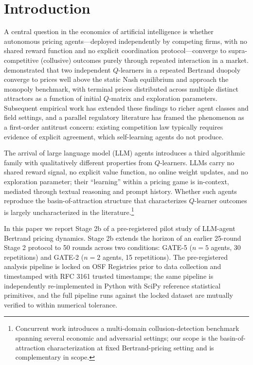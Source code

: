 \section{Introduction}
\label{sec:intro}

A central question in the economics of artificial intelligence is whether autonomous pricing
agents---deployed independently by competing firms, with no shared reward function and no
explicit coordination protocol---converge to supra-competitive (collusive) outcomes purely
through repeated interaction in a market. \citet{calvano_etal_2020_ai_algorithmic_pricing_collusion} demonstrated that two
independent $Q$-learners in a repeated Bertrand duopoly converge to prices well above the
static Nash equilibrium and approach the monopoly benchmark, with terminal prices distributed
across multiple distinct attractors as a function of initial $Q$-matrix and exploration
parameters. Subsequent empirical work \citep{assad_etal_2024_algorithmic_pricing_competition_empirical,fish2024algorithmicCollusion}
has extended these findings to richer agent classes and field settings, and a parallel
regulatory literature \citep{ezrachi2016virtual,asker2021ai_pricing} has framed the
phenomenon as a first-order antitrust concern: existing competition law typically requires
evidence of explicit agreement, which self-learning agents do not produce.

The arrival of large language model (LLM) agents introduces a third algorithmic family with
qualitatively different properties from $Q$-learners. LLMs carry no shared reward signal, no
explicit value function, no online weight updates, and no exploration parameter; their
``learning'' within a pricing game is in-context, mediated through textual reasoning and
prompt history. Whether such agents reproduce the basin-of-attraction structure that
characterizes $Q$-learner outcomes
\citep{waltman_kaymak_2008_qlearning_cournot,wunder_littman_babes_2010_qlearning_basin}
is largely uncharacterized in the literature.\footnote{Concurrent work
\citep{Tailor_2025_whisper} introduces a multi-domain collusion-detection benchmark spanning
several economic and adversarial settings; our scope is the basin-of-attraction
characterization at fixed Bertrand-pricing setting and is complementary in scope.}

In this paper we report Stage 2b of a pre-registered pilot study of LLM-agent Bertrand
pricing dynamics. Stage 2b extends the horizon of an earlier 25-round Stage 2 protocol to
50 rounds across two conditions: GATE-5 ($n=5$ agents, 30 repetitions) and GATE-2 ($n=2$
agents, 15 repetitions). The pre-registered analysis pipeline is locked on OSF Registries
prior to data collection and timestamped with RFC 3161 trusted timestamps; the same pipeline
is independently re-implemented in Python with SciPy reference statistical primitives, and
the full pipeline runs against the locked dataset are mutually verified to within numerical
tolerance.

